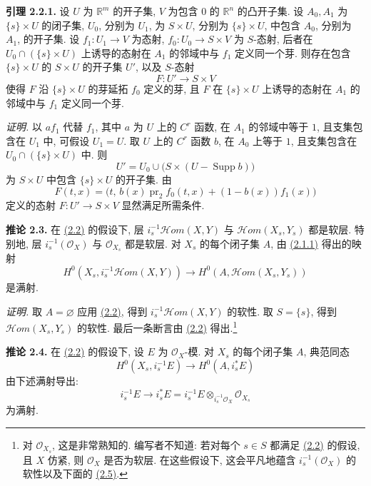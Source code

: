 \textbf{引理 2.2.1.} 设 $U$ 为 $\mathbb R^m$ 的开子集, $V$ 为包含 $0$ 的 $\mathbb R^n$ 的凸开子集. 设 $A_0,A_1$ 为 $\{s\}\times U$ 的闭子集, $U_0$, 分别为 $U_1$, 为 $S\times U$, 分别为 $\{s\}\times U$, 中包含 $A_0$, 分别为 $A_1$, 的开子集. 设 $f_1:U_1\to V$ 为态射, $f_0:U_0\to S\times V$ 为 $S$-态射, 后者在 $U_0\cap(\{s\}\times U)$ 上诱导的态射在 $A_1$ 的邻域中与 $f_1$ 定义同一个芽. 则存在包含 $\{s\}\times U$ 的 $S\times U$ 的开子集 $U'$, 以及 $S$-态射
\[
 F:U'\longrightarrow S\times V
\]
使得 $F$ 沿 $\{s\}\times U$ 的芽延拓 $f_0$ 定义的芽, 且 $F$ 在 $\{s\}\times U$ 上诱导的态射在 $A_1$ 的邻域中与 $f_1$ 定义同一个芽.

\emph{证明.} 以 $af_1$ 代替 $f_1$, 其中 $a$ 为 $U$ 上的 $C^r$ 函数, 在 $A_1$ 的邻域中等于 $1$, 且支集包含在 $U_1$ 中, 可假设 $U_1=U$. 取 $U$ 上的 $C^r$ 函数 $b$, 在 $A_0$ 上等于 $1$, 且支集包含在 $U_0\cap(\{s\}\times U)$ 中. 则
\[
 U' = U_0\cup\bigl(S\times (U-\operatorname{Supp}b)\bigr)
\]
为 $S\times U$ 中包含 $\{s\}\times U$ 的开子集. 由
\[
 F(t,x)=\bigl(t,\,b(x)\operatorname{pr}_2 f_0(t,x)+(1-b(x))f_1(x)\bigr)
\]
定义的态射 $F:U'\to S\times V$ 显然满足所需条件.

\textbf{推论 2.3.} 在 \hyperlink{sga6.e02.prop.2-2}{(2.2)} 的假设下, 层 $i_s^{-1}\mathcal Hom(X,Y)$ 与 $\mathcal Hom(X_s,Y_s)$ 都是软层. 特别地, 层 $i_s^{-1}(\mathcal O_X)$ 与 $\mathcal O_{X_s}$ 都是软层. 对 $X_s$ 的每个闭子集 $A$, 由 \hyperlink{sga6.e02.eq.2-1-1}{(2.1.1)} 得出的映射
\[
 H^0(X_s,i_s^{-1}\mathcal Hom(X,Y))\longrightarrow H^0(A,\mathcal Hom(X_s,Y_s))
\]
是满射.

\emph{证明.} 取 $A=\varnothing$ 应用 \hyperlink{sga6.e02.prop.2-2}{(2.2)}, 得到 $i_s^{-1}\mathcal Hom(X,Y)$ 的软性. 取 $S=\{s\}$, 得到 $\mathcal Hom(X_s,Y_s)$ 的软性. 最后一条断言由 \hyperlink{sga6.e02.prop.2-2}{(2.2)} 得出.\footnote{对 $\mathcal O_{X_s}$, 这是非常熟知的. 编写者不知道: 若对每个 $s\in S$ 都满足 \hyperlink{sga6.e02.prop.2-2}{(2.2)} 的假设, 且 $X$ 仿紧, 则 $\mathcal O_X$ 是否为软层. 在这些假设下, 这会平凡地蕴含 $i_s^{-1}(\mathcal O_X)$ 的软性以及下面的 \hyperlink{sga6.e02.cor.2-5}{(2.5)}.}

\textbf{推论 2.4.} 在 \hyperlink{sga6.e02.prop.2-2}{(2.2)} 的假设下, 设 $E$ 为 $\mathcal O_X$-模. 对 $X_s$ 的每个闭子集 $A$, 典范同态
\[
 H^0(X_s,i_s^{-1}E)\longrightarrow H^0(A,i_s^*E)
\]
由下述满射导出:
\[
 i_s^{-1}E\longrightarrow i_s^*E=i_s^{-1}E\otimes_{i_s^{-1}\mathcal O_X}\mathcal O_{X_s}
\]
为满射.

